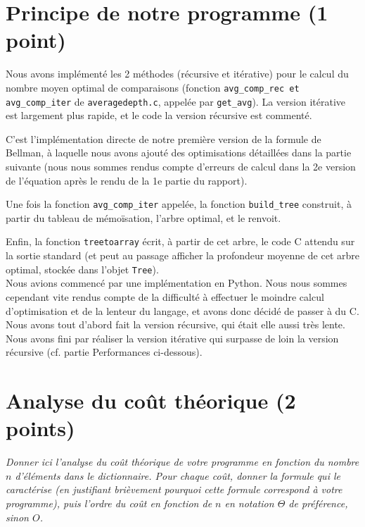 \documentclass[a4paper, 10pt, french]{article}
\begin{document}
\section{Principe de notre  programme (1 point)}
{Nous avons implémenté les 2 méthodes (récursive et itérative) pour le calcul du nombre moyen optimal de comparaisons (fonction \verb?avg_comp_rec et avg_comp_iter? de \verb?averagedepth.c?, appelée par \verb?get_avg?). La version itérative est largement plus rapide, et le code la version récursive est commenté.

	C'est l'implémentation directe de notre première version de la formule de Bellman, à laquelle nous avons ajouté des optimisations détaillées dans la partie suivante (nous nous sommes rendus compte d'erreurs de calcul dans la 2e version de l'équation après le rendu de la 1e partie du rapport).

Une fois la fonction \verb?avg_comp_iter? appelée, la fonction \verb?build_tree? construit, à partir du tableau de mémoïsation, l'arbre optimal, et le renvoit.

Enfin, la fonction \verb?treetoarray? écrit, à partir de cet arbre, le code C attendu sur la sortie standard (et peut au passage afficher la profondeur moyenne de cet arbre optimal, stockée dans l'objet \verb?Tree?).\\


Nous avions commencé par une implémentation en Python. Nous nous sommes cependant vite rendus compte de la difficulté à effectuer le moindre calcul d'optimisation et de la lenteur du langage, et avons donc décidé de passer à du C.
Nous avons tout d'abord fait la version récursive, qui était elle aussi très lente. Nous avons fini par réaliser la version itérative qui surpasse de loin la version récursive (cf. partie Performances ci-dessous).
} 

\section{Analyse du coût théorique (2 points)}
{\em Donner ici l'analyse du coût théorique de votre programme en fonction du nombre $n$ d'éléments dans le dictionnaire.
 Pour chaque coût, donner la formule qui le caractérise (en justifiant brièvement pourquoi cette formule correspond à votre programme), 
 puis l'ordre du coût en fonction de $n$ en notation $\Theta$ de préférence, sinon $O$.}
\end{document}
